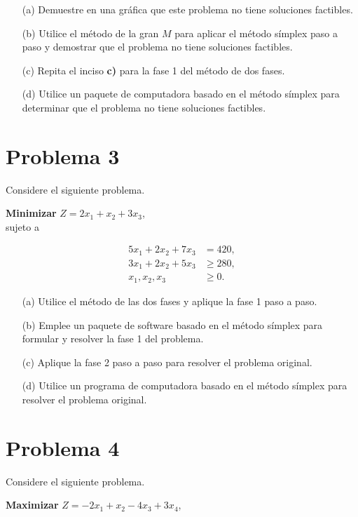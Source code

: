 \documentclass{article}
\begin{document}
\begin{enumerate}
    \item[(a)] Demuestre en una gráfica que este problema no tiene soluciones factibles.
    \item[(b)] Utilice el método de la gran $M$ para aplicar el método símplex paso a paso y demostrar que el problema no tiene soluciones factibles.
    \item[(c)] Repita el inciso \textbf{c)} para la fase 1 del método de dos fases.
    \item[(d)] Utilice un paquete de computadora basado en el método símplex para determinar que el problema no tiene soluciones factibles.
\end{enumerate}

\section{Problema 3}

Considere el siguiente problema.

\textbf{Minimizar} \quad $Z = 2x_1 + x_2 + 3x_3$,\\

sujeto a 

\[
\begin{aligned}
5x_1 + 2x_2 + 7x_3 &= 420, \\
3x_1 + 2x_2 + 5x_3 &\geq 280, \\
x_1, x_2, x_3 & \geq 0.
\end{aligned}
\]

\begin{enumerate}
    \item[(a)] Utilice el método de las dos fases y aplique la fase 1 paso a paso.
    \item[(b)] Emplee un paquete de software basado en el método símplex para formular y resolver la fase 1 del problema.
    \item[(c)] Aplique la fase 2 paso a paso para resolver el problema original.
    \item[(d)] Utilice un programa de computadora basado en el método símplex para resolver el problema original.
\end{enumerate}

\section{Problema 4}

Considere el siguiente problema.

\textbf{Maximizar} \quad $Z = -2x_1 + x_2 - 4x_3 + 3x_4$,\\
\end{document}
